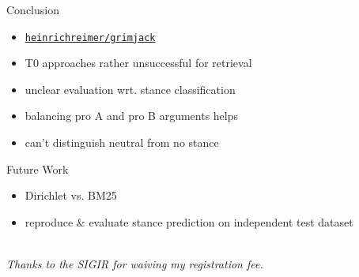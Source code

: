 \documentclass[english]{mlutalk}
\begin{document}
\begin{frame}{Conclusion}
  \begin{itemize}
    \setlength{\itemsep}{2ex}
    \item[\faIcon{github}] \href{https://github.com/heinrichreimer/grimjack}{\texttt{heinrichreimer/grimjack}}
    \item T0 approaches rather unsuccessful for retrieval
    \item unclear evaluation wrt. stance classification
    \item balancing pro A and pro B arguments helps
    \item can't distinguish neutral from no stance
  \end{itemize}
  \vspace{2ex}
  \begin{block}{Future Work}
    \begin{itemize}
      \setlength{\itemsep}{2ex}
      \item Dirichlet vs. BM25
      \item reproduce \& evaluate stance prediction on independent test dataset
    \end{itemize}
  \end{block}
  \begin{flushright}
    \thankyou \\
    {\itshape\scriptsize Thanks to the SIGIR for waiving my registration fee.}
  \end{flushright}
\end{frame}

\appendix
\section{\appendixname}

\bibliographyframe
\end{document}
